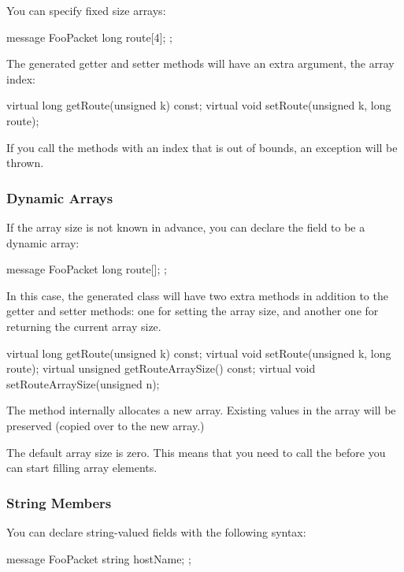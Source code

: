 You can specify fixed size arrays:

\begin{msg}
message FooPacket
{
    long route[4];
};
\end{msg}

The generated getter and setter methods will have an extra  argument,
the array index:

\begin{cpp}
virtual long getRoute(unsigned k) const;
virtual void setRoute(unsigned k, long route);
\end{cpp}

If you call the methods with an index that is out of bounds, an exception
will be thrown.


\subsubsection{Dynamic Arrays}

If the array size is not known in advance, you can declare the field
to be a dynamic array:

\begin{msg}
message FooPacket
{
    long route[];
};
\end{msg}

In this case, the generated class will have two extra methods in addition
to the getter and setter methods: one for setting the array size, and another
one for returning the current array size.

\begin{cpp}
virtual long getRoute(unsigned k) const;
virtual void setRoute(unsigned k, long route);
virtual unsigned getRouteArraySize() const;
virtual void setRouteArraySize(unsigned n);
\end{cpp}

The  method internally allocates a new array. Existing
values in the array will be preserved (copied over to the new array.)

The default array size is zero. This means that you need to call the
 before you can start filling array elements.


\subsubsection{String Members}

You can declare string-valued fields with the following syntax:

\begin{msg}
message FooPacket
{
    string hostName;
};
\end{msg}

